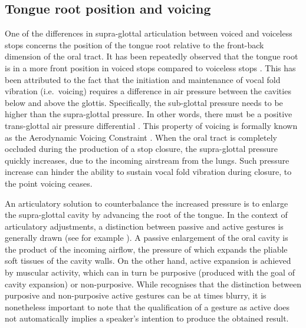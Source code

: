 \documentclass[12pt,]{article}
\begin{document}
\hypertarget{tongue-root-position-and-voicing}{%
\subsection{Tongue root position and
voicing}\label{tongue-root-position-and-voicing}}

One of the differences in supra-glottal articulation between voiced and
voiceless stops concerns the position of the tongue root relative to the
front-back dimension of the oral tract. It has been repeatedly observed
that the tongue root is in a more front position in voiced stops
compared to voiceless stops \citep{kent1969, perkell1969, westbury1983}.
This has been attributed to the fact that the initiation and maintenance
of vocal fold vibration (i.e.~voicing) requires a difference in air
pressure between the cavities below and above the glottis. Specifically,
the sub-glottal pressure needs to be higher than the supra-glottal
pressure. In other words, there must be a positive trans-glottal air
pressure differential \citep{berg1958, rothenberg1967}. This property of
voicing is formally known as the Aerodynamic Voicing Constraint
\citep{ohala2011}. When the oral tract is completely occluded during the
production of a stop closure, the supra-glottal pressure quickly
increases, due to the incoming airstream from the lungs. Such pressure
increase can hinder the ability to sustain vocal fold vibration during
closure, to the point voicing ceases.

An articulatory solution to counterbalance the increased pressure is to
enlarge the supra-glottal cavity by advancing the root of the tongue. In
the context of articulatory adjustments, a distinction between passive
and active gestures is generally drawn (see for example
\citealt{rothenberg1967}). A passive enlargement of the oral cavity is
the product of the incoming airflow, the pressure of which expands the
pliable soft tissues of the cavity walls. On the other hand, active
expansion is achieved by muscular activity, which can in turn be
purposive (produced with the goal of cavity expansion) or non-purposive.
While \citet{rothenberg1967} recognises that the distinction between
purposive and non-purposive active gestures can be at times blurry, it
is nonetheless important to note that the qualification of a gesture as
active does not automatically implies a speaker's intention to produce
the obtained result.
\end{document}
